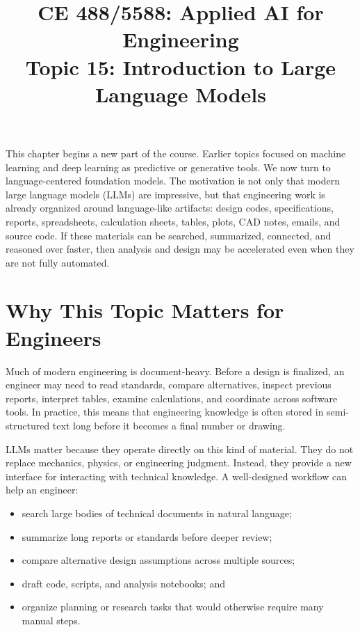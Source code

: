 \documentclass[12pt]{article}
\begin{document}
\doublespacing

\title{CE 488/5588: Applied AI for Engineering\\ \large Topic 15: Introduction to Large Language Models}
\author{}
\date{}
\maketitle

\begin{ch-box}
This chapter begins a new part of the course. Earlier topics focused on machine learning and deep learning as predictive or generative tools. We now turn to language-centered foundation models. The motivation is not only that modern large language models (LLMs) are impressive, but that engineering work is already organized around language-like artifacts: design codes, specifications, reports, spreadsheets, calculation sheets, tables, plots, CAD notes, emails, and source code. If these materials can be searched, summarized, connected, and reasoned over faster, then analysis and design may be accelerated even when they are not fully automated.
\end{ch-box}

\section{Why This Topic Matters for Engineers}

Much of modern engineering is document-heavy. Before a design is finalized, an engineer may need to read standards, compare alternatives, inspect previous reports, interpret tables, examine calculations, and coordinate across software tools. In practice, this means that engineering knowledge is often stored in semi-structured text long before it becomes a final number or drawing.

LLMs matter because they operate directly on this kind of material. They do not replace mechanics, physics, or engineering judgment. Instead, they provide a new interface for interacting with technical knowledge. A well-designed workflow can help an engineer:

\begin{itemize}
    \item search large bodies of technical documents in natural language;
    \item summarize long reports or standards before deeper review;
    \item compare alternative design assumptions across multiple sources;
    \item draft code, scripts, and analysis notebooks; and
    \item organize planning or research tasks that would otherwise require many manual steps.
\end{itemize}
\end{document}
